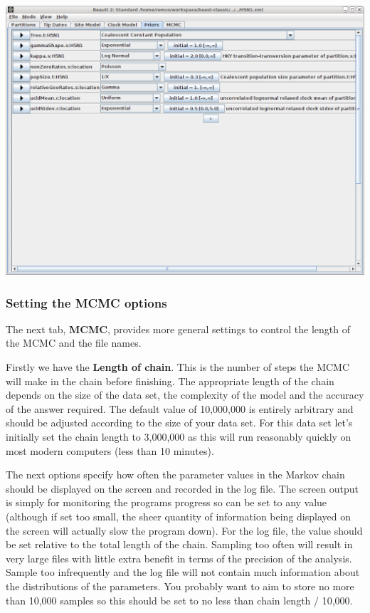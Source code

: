 \documentclass{article}
\begin{document}
\includegraphics[scale=0.4,clip=true,trim=0 200 0 0]{figures/BEAUti_priors2.png}

\subsubsection*{Setting the MCMC options }

The next tab, {\bf MCMC}, provides more general
settings to control the length of the MCMC and the file names. 

Firstly we have the \textbf{Length of chain}. This is the number of
steps the MCMC will make in the chain before finishing. The appropriate length of the chain depends on the size of the data set, the complexity of the
model and the accuracy of the answer required. The default value of 10,000,000
is entirely arbitrary and should be adjusted according to the size
of your data set. For this data set let's initially set the chain
length to 3,000,000 as this will run reasonably quickly on most modern
computers (less than 10 minutes).

The next options specify how often the parameter values in the Markov
chain should be displayed on the screen and recorded in the log file.
The screen output is simply for monitoring the programs progress so
can be set to any value (although if set too small, the sheer quantity
of information being displayed on the screen will actually slow the
program down). For the log file, the value should be set relative
to the total length of the chain. Sampling too often will result in
very large files with little extra benefit in terms of the precision
of the analysis. Sample too infrequently and the log file will not
contain much information about the distributions of the parameters. 
You probably want to aim to store no more than 10,000 samples so this should be
set to no less than chain length / 10,000.
\end{document}
